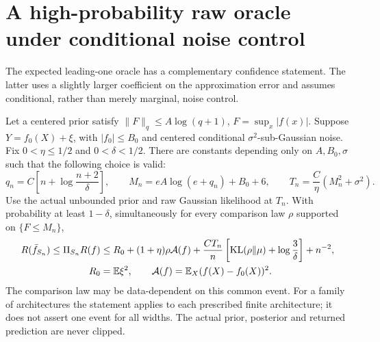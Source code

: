 \section{A high-probability raw oracle under conditional noise control}
\label{sec:asinh-high-probability}
The expected leading-one oracle has a complementary confidence
statement. The latter uses a slightly larger coefficient on the
approximation error and assumes conditional, rather than merely
marginal, noise control.

\begin{theorem}
\label{thm:asinh-high-probability}
Let a centered prior satisfy
$\|F\|_q\le A\log(q+1)$, $F=\sup_x|f(x)|$.
Suppose $Y=f_0(X)+\xi$, with $|f_0|\le B_0$ and centered conditional
$\sigma^2$-sub-Gaussian noise. Fix $0<\eta\le1/2$ and
$0<\delta<1/2$. There are constants depending only on $A,B_0,\sigma$
such that the following choice is valid:
\[
 q_n=C\left[n+\log\frac{n+2}{\delta}\right],\qquad
 M_n=eA\log(e+q_n)+B_0+6,\qquad
 T_n=\frac C\eta(M_n^2+\sigma^2).
\]
Use the actual unbounded prior and raw Gaussian likelihood at
$T_n$. With probability at least $1-\delta$, simultaneously for every
comparison law $\rho$ supported on $\{F\le M_n\}$,
\begin{align}
 R(\bar f_{S_n})\le\Pi_{S_n}R(f)
 &\le R_0+(1+\eta)\rho\mathcal A(f)
    +\frac{CT_n}{n}\left[\operatorname{KL}(\rho\|\mu)+\log\frac3\delta\right]
    +n^{-2},\label{eq:asinh-hp-oracle}\\
 R_0&=\mathbb E\xi^2,\qquad
 \mathcal A(f)=\mathbb E_X(f(X)-f_0(X))^2.\notag
\end{align}
The comparison law may be data-dependent on this common event.
For a family of architectures the statement applies to each prescribed
finite architecture; it does not assert one event for all widths.
The actual prior, posterior and returned prediction are never clipped.
\end{theorem}
